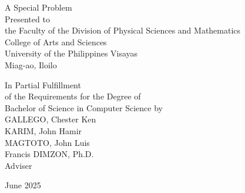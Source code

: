 \begin{titlepage}
\centering


\vspace{0.875cm}
A Special Problem\\
Presented to\\
the Faculty of the Division of Physical Sciences and Mathematics\\
College of Arts and Sciences\\
University of the Philippines Visayas\\
Miag-ao, Iloilo

\vspace{0.875cm}
In Partial Fulfillment\\
of the Requirements for the Degree of\\
Bachelor of Science in Computer Science
\vspace{1.75cm}
by\\

\vspace{0.1cm}
GALLEGO, Chester Ken  \\
KARIM, John Hamir  \\
MAGTOTO, John Luis  \\

\vspace{0.875cm}
Francis DIMZON, Ph.D. \\
Adviser\\


\vspace{0.875cm}

June 2025

\end{titlepage}
